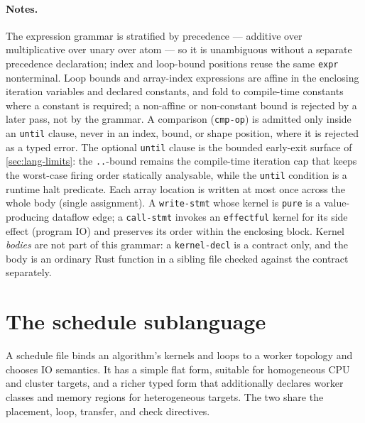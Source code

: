 \paragraph{Notes.} The expression grammar is stratified by precedence ---
additive over multiplicative over unary over atom --- so it is unambiguous without
a separate precedence declaration; index and loop-bound positions reuse the same
\texttt{expr} nonterminal. Loop bounds and array-index expressions are affine in
the enclosing iteration variables and declared constants, and fold to compile-time
constants where a constant is required; a non-affine or non-constant bound is
rejected by a later pass, not by the grammar. A comparison (\texttt{cmp-op}) is
admitted only inside an \texttt{until} clause, never in an index, bound, or shape
position, where it is rejected as a typed error. The optional \texttt{until}
clause is the bounded early-exit surface of \cref{sec:lang-limits}: the
\texttt{..}-bound remains the compile-time iteration cap that keeps the worst-case
firing order statically analysable, while the \texttt{until} condition is a runtime
halt predicate. Each array location is written at most once across the whole body
(single assignment). A \texttt{write-stmt} whose kernel is \texttt{pure} is a
value-producing dataflow edge; a \texttt{call-stmt} invokes an \texttt{effectful}
kernel for its side effect (program IO) and preserves its order within the
enclosing block. Kernel \emph{bodies} are not part of this grammar: a
\texttt{kernel-decl} is a contract only, and the body is an ordinary Rust function
in a sibling file checked against the contract separately.

\section{The schedule sublanguage}

A schedule file binds an algorithm's kernels and loops to a worker topology and
chooses IO semantics. It has a simple flat form, suitable for homogeneous CPU and
cluster targets, and a richer typed form that additionally declares worker classes
and memory regions for heterogeneous targets. The two share the placement, loop,
transfer, and check directives.

